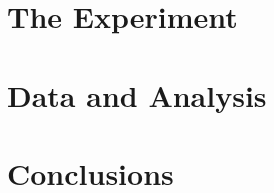 \section{The Experiment}
\label{sec:experm}


\section{Data and Analysis}
\label{danal}


\section{Conclusions}
\label{conclusions}









